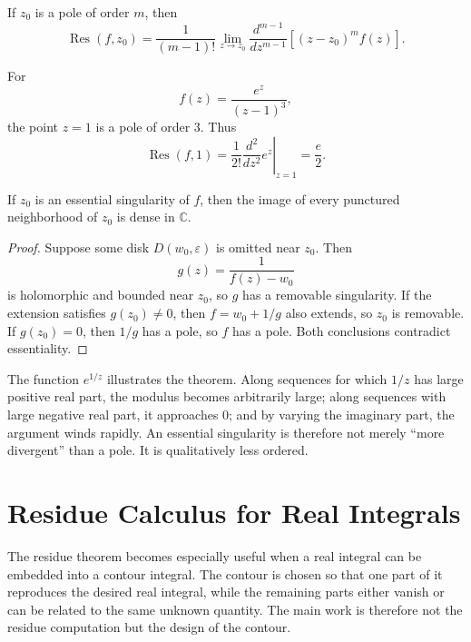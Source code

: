 \begin{proposition}
If $z_0$ is a pole of order $m$, then
\[
    \operatorname{Res}(f,z_0)
    =\frac{1}{(m-1)!}
    \lim_{z\to z_0}
    \frac{d^{m-1}}{dz^{m-1}}
    \left[(z-z_0)^m f(z)\right].
\]
\end{proposition}

\begin{example}
For
\[
    f(z)=\frac{e^z}{(z-1)^3},
\]
the point $z=1$ is a pole of order $3$. Thus
\[
    \operatorname{Res}(f,1)
    =\frac{1}{2!}\left.\frac{d^2}{dz^2}e^z\right|_{z=1}
    =\frac{e}{2}.
\]
\end{example}

\begin{theorem}
If $z_0$ is an essential singularity of $f$, then the image of every punctured neighborhood of $z_0$ is dense in $\mathbb{C}$.
\end{theorem}

\begin{proof}
Suppose some disk $D(w_0,\varepsilon)$ is omitted near $z_0$. Then
\[
    g(z)=\frac{1}{f(z)-w_0}
\]
is holomorphic and bounded near $z_0$, so $g$ has a removable singularity. If the extension satisfies $g(z_0)\neq0$, then $f=w_0+1/g$ also extends, so $z_0$ is removable. If $g(z_0)=0$, then $1/g$ has a pole, so $f$ has a pole. Both conclusions contradict essentiality.
\end{proof}

\begin{remark}
The function $e^{1/z}$ illustrates the theorem. Along sequences for which $1/z$ has large positive real part, the modulus becomes arbitrarily large; along sequences with large negative real part, it approaches $0$; and by varying the imaginary part, the argument winds rapidly. An essential singularity is therefore not merely ``more divergent'' than a pole. It is qualitatively less ordered.
\end{remark}

\section{Residue Calculus for Real Integrals}

The residue theorem becomes especially useful when a real integral can be embedded into a contour integral. The contour is chosen so that one part of it reproduces the desired real integral, while the remaining parts either vanish or can be related to the same unknown quantity. The main work is therefore not the residue computation but the design of the contour.

